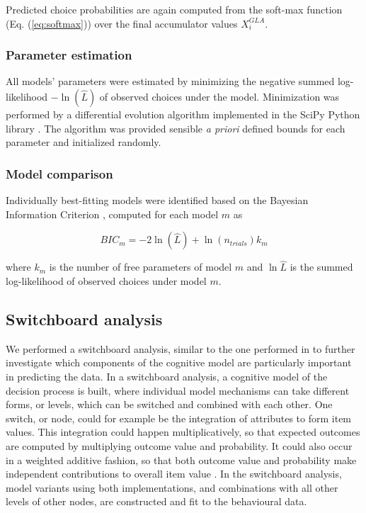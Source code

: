 \documentclass[11pt, a4paper]{article}
\begin{document}
Predicted choice probabilities are again computed from the soft-max function (Eq. (\ref{eq:softmax})) over the final accumulator values $X_i^{GLA}$.

\subsubsection*{Parameter estimation}

All models' parameters were estimated by minimizing the negative summed log-likelihood $-\ln{(\hat{L})}$ of observed choices under the model. Minimization was performed by a differential evolution algorithm \parencite{storn1997DifferentialEvolutionSimple} implemented in the SciPy Python library \parencite[][version 1.2.1]{jones2001SciPyOpenSource}. The algorithm was provided sensible \emph{a priori} defined bounds for each parameter and initialized randomly.

\subsubsection*{Model comparison}

Individually best-fitting models were identified based on the Bayesian Information Criterion \parencite[BIC;][]{schwarz1978EstimatingDimensionModel}, computed for each model $m$ as

\begin{equation}
    \label{eq:bic}
    BIC_m = -2 \ln{(\hat{L})} + \ln{(n_{trials})} k_m
\end{equation}

where $k_m$ is the number of free parameters of model $m$ and $\ln{\hat{L}}$ is the summed log-likelihood of observed choices under model $m$.

\subsection*{Switchboard analysis}
\label{sec:methods:switchboard}

We performed a switchboard analysis, similar to the one performed in \textcite{turner2018CompetingTheoriesMultialternative} to further investigate which components of the cognitive model are particularly important in predicting the data. In a switchboard analysis, a cognitive model of the decision process is built, where individual model mechanisms can take different forms, or levels, which can be switched and combined with each other. One switch, or node, could for example be the integration of attributes to form item values. This integration could happen multiplicatively, so that expected outcomes are computed by multiplying outcome value and probability. It could also occur in a weighted additive fashion, so that both outcome value and probability make independent contributions to overall item value \parencite[see][, for example]{rouault2019PrefrontalMechanismsCombining}. In the switchboard analysis, model variants using both implementations, and combinations with all other levels of other nodes, are constructed and fit to the behavioural data.
\end{document}
